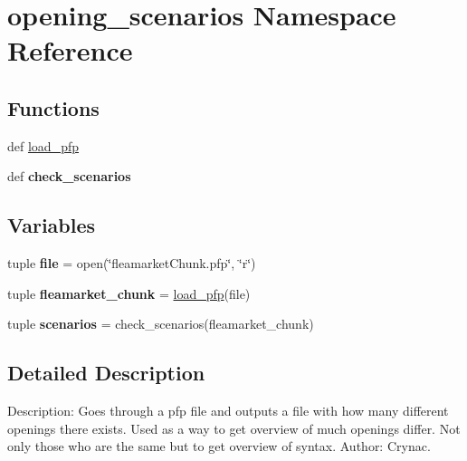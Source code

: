 \hypertarget{namespaceopening__scenarios}{\section{opening\-\_\-scenarios Namespace Reference}
\label{namespaceopening__scenarios}
}
\subsection*{Functions}
\begin{DoxyCompactItemize}
\item 
def \hyperlink{namespaceopening__scenarios_a07986406e08359b993d92b5484ea7df4}{load\-\_\-pfp}
\item 
\hypertarget{namespaceopening__scenarios_a72c80b113f06e81fb88265cd0aabdbc5}{def {\bfseries check\-\_\-scenarios}}\label{namespaceopening__scenarios_a72c80b113f06e81fb88265cd0aabdbc5}

\end{DoxyCompactItemize}
\subsection*{Variables}
\begin{DoxyCompactItemize}
\item 
\hypertarget{namespaceopening__scenarios_a0b4004e997fc6247aaf811bc39626c9d}{tuple {\bfseries file} = open(\char`\"{}fleamarket\-Chunk.\-pfp\char`\"{}, \char`\"{}r\char`\"{})}\label{namespaceopening__scenarios_a0b4004e997fc6247aaf811bc39626c9d}

\item 
\hypertarget{namespaceopening__scenarios_abce0598aec11ca2e0fa3dce2e02c1dda}{tuple {\bfseries fleamarket\-\_\-chunk} = \hyperlink{namespaceopening__scenarios_a07986406e08359b993d92b5484ea7df4}{load\-\_\-pfp}(file)}\label{namespaceopening__scenarios_abce0598aec11ca2e0fa3dce2e02c1dda}

\item 
\hypertarget{namespaceopening__scenarios_a3d2353dbc36b9fa6e02e7014bac1ef86}{tuple {\bfseries scenarios} = check\-\_\-scenarios(fleamarket\-\_\-chunk)}\label{namespaceopening__scenarios_a3d2353dbc36b9fa6e02e7014bac1ef86}

\end{DoxyCompactItemize}


\subsection{Detailed Description}
\begin{DoxyVerb}    Description: Goes through a pfp file and outputs a file with how many different openings there exists.
        Used as a way to get overview of much openings differ. Not only those who are the same but to get overview of syntax.
    Author: Crynac.
\end{DoxyVerb}
 

